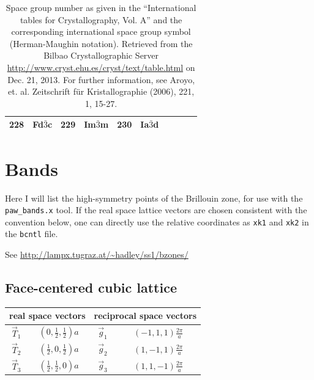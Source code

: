 \documentclass[final,12pt,makeidx,DIV=calc]{article}
\begin{document}
{{{{{{\begin{table}[!h]
\begin{center}
\begin{tabular}{||r|l||r|l||r|l||r|l||r|l||}
228    & Fd$\bar{3}$c       & 
229    & Im$\bar{3}$m       & 
230    & Ia$\bar{3}$d       \\
\hline
\end{tabular}
\end{center}
\caption{\label{table:spacegroupnumber_b}Space group number as given
  in the ``International tables for Crystallography, Vol. A'' and the
  corresponding international space group symbol (Herman-Maughin
  notation). Retrieved from the Bilbao Crystallographic Server
  \url{http://www.cryst.ehu.es/cryst/text/table.html} on Dec. 21,
  2013.  For further information, see Aroyo, et. al. Zeitschrift f\"ur
  Kristallographie (2006), 221, 1, 15-27.  }
\end{table}


\newpage
\section{Bands}
Here I will list the high-symmetry points of the Brillouin zone, for
use with the \verb|paw_bands.x| tool. If the real space lattice vectors are
chosen consistent with the convention below, one can directly use the
relative coordinates as \verb|xk1| and \verb|xk2| in the \verb|bcntl|
file.

See \url{http://lampx.tugraz.at/~hadley/ss1/bzones/}

\subsection{Face-centered cubic lattice}
\begin{center}
\renewcommand\arraystretch{1.5}
\begin{tabular}{||c|c||c|c||}
\hline
\multicolumn{2}{|c|}{real space vectors} &
\multicolumn{2}{|c|}{reciprocal space vectors} \\
\hline
$\vec{T}_1$ & $(0,\frac{1}{2},\frac{1}{2}) a$ &
$\vec{g}_1$ & $(-1,1,1)\frac{2\pi}{a}$ \\
$\vec{T}_2$ & $(\frac{1}{2},0,\frac{1}{2}) a$ &
$\vec{g}_2$ & $(1,-1,1)\frac{2\pi}{a}$ \\
$\vec{T}_3$ & $(\frac{1}{2},\frac{1}{2},0) a$ &
$\vec{g}_3$ & $(1,1,-1)\frac{2\pi}{a}$ \\
\hline
\end{tabular}
\renewcommand\arraystretch{1.}
\end{center}

}}}}}}
\end{document}
